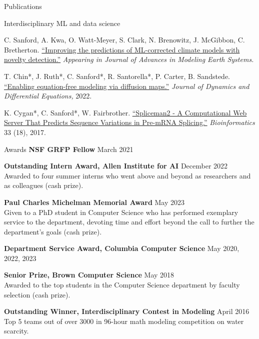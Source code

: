 \documentclass{resume} %
\begin{document}
\begin{rSection}{Publications}
\begin{rSubsection}{Interdisciplinary ML and data science}{}{}{}{}
\item C. Sanford, A. Kwa, O. Watt-Meyer, S. Clark, N. Brenowitz, J. McGibbon, C. Bretherton. \href{https://essopenarchive.org/doi/full/10.22541/essoar.168500343.32924398}{``Improving the predictions of ML-corrected climate models with novelty detection.''} \textit{Appearing in Journal of Advances in Modeling Earth Systems.}

\item T. Chin*, J. Ruth*, C. Sanford*, R. Santorella*, P. Carter, B. Sandstede. \href{https://link.springer.com/article/10.1007/s10884-021-10127-w}{``Enabling equation-free modeling via diffusion maps.''} \textit{Journal of Dynamics and Differential Equations,} 2022.

\item K. Cygan*, C. Sanford*, W. Fairbrother. \href{https://academic.oup.com/bioinformatics/article/33/18/2943/3887237?login=true}{``Spliceman2 - A Computational Web Server That Predicts Sequence Variations in Pre-mRNA Splicing.''}
\textit{Bioinformatics} 33 (18), 2017.
\end{rSubsection}


\end{rSection}



\begin{rSection}{Awards} \itemsep -2pt
\textbf{NSF GRFP Fellow} \hfill March 2021

\textbf{Outstanding Intern Award, Allen Institute for AI} \hfill December 2022\\
Awarded to four summer interns who went above and beyond as researchers and as colleagues (cash prize).

\textbf{Paul Charles Michelman Memorial Award} \hfill May 2023 \\
Given to a PhD student in Computer Science who has performed exemplary service to the department, devoting time and effort beyond the call to further the department’s goals (cash prize).

\textbf{Department Service Award, Columbia Computer Science} \hfill May 2020, 2022, 2023

\textbf{Senior Prize, Brown Computer Science} \hfill May 2018 \\
Awarded to the top students in the Computer Science department by faculty selection (cash prize).

\textbf{Outstanding Winner, Interdisciplinary Contest in Modeling} \hfill April 2016 \\
Top 5 teams out of over 3000 in 96-hour math modeling competition on water scarcity.
\end{rSection}
\end{document}
